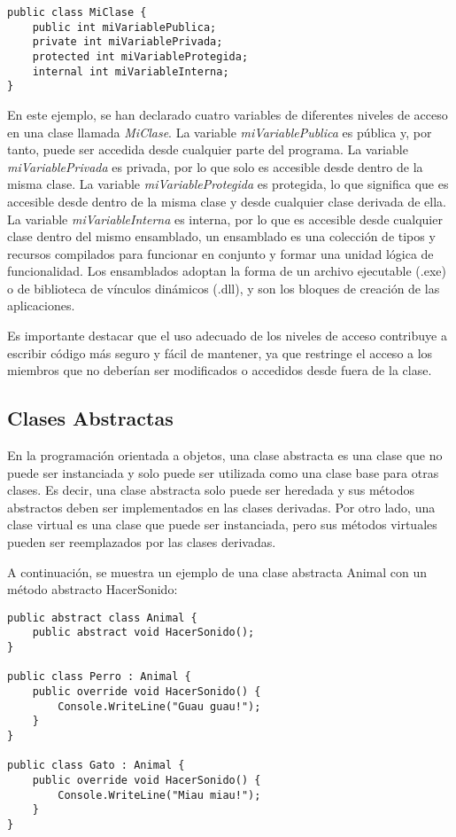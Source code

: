 \documentclass[executivepaper]{article}
\begin{document}
\begin{lstlisting}
public class MiClase {
    public int miVariablePublica;
    private int miVariablePrivada;
    protected int miVariableProtegida;
    internal int miVariableInterna;
}
\end{lstlisting}

En este ejemplo, se han declarado cuatro variables de diferentes niveles de acceso en una clase llamada \emph{MiClase}. La variable \emph{miVariablePublica} es pública y, por tanto, puede ser accedida desde cualquier parte del programa. La variable \emph{miVariablePrivada} es privada, por lo que solo es accesible desde dentro de la misma clase. La variable \emph{miVariableProtegida} es protegida, lo que significa que es accesible desde dentro de la misma clase y desde cualquier clase derivada de ella. La variable \emph{miVariableInterna} es interna, por lo que es accesible desde cualquier clase dentro del mismo ensamblado, un ensamblado es una colección de tipos y recursos compilados para funcionar en conjunto y formar una unidad lógica de funcionalidad. Los ensamblados adoptan la forma de un archivo ejecutable (.exe) o de biblioteca de vínculos dinámicos (.dll), y son los bloques de creación de las aplicaciones.

Es importante destacar que el uso adecuado de los niveles de acceso contribuye a escribir código más seguro y fácil de mantener, ya que restringe el acceso a los miembros que no deberían ser modificados o accedidos desde fuera de la clase.

\subsection{Clases Abstractas}

En la programación orientada a objetos, una clase abstracta es una clase que no puede ser instanciada y solo puede ser utilizada como una clase base para otras clases. Es decir, una clase abstracta solo puede ser heredada y sus métodos abstractos deben ser implementados en las clases derivadas. Por otro lado, una clase virtual es una clase que puede ser instanciada, pero sus métodos virtuales pueden ser reemplazados por las clases derivadas.

A continuación, se muestra un ejemplo de una clase abstracta Animal con un método abstracto HacerSonido:

\begin{lstlisting}
public abstract class Animal {
    public abstract void HacerSonido();
}

public class Perro : Animal {
    public override void HacerSonido() {
        Console.WriteLine("Guau guau!");
    }
}

public class Gato : Animal {
    public override void HacerSonido() {
        Console.WriteLine("Miau miau!");
    }
}
\end{lstlisting}
\end{document}
